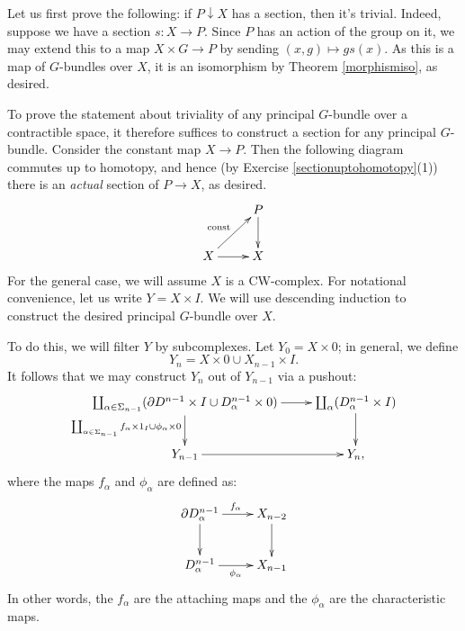 Let us first prove the following: if $P\downarrow X$ has a section, then it's
trivial. Indeed, suppose we have a section $s:X\to P$. Since $P$ has an action
of the group on it, we may extend this to a map $X\times G\to P$ by sending
$(x,g)\mapsto gs(x)$. As this is a map of $G$-bundles over $X$, it is an
isomorphism by Theorem \ref{morphismiso}, as desired.

To prove the statement about triviality of any principal $G$-bundle over a
contractible space, it therefore suffices to construct a section for any
principal $G$-bundle. Consider the constant map $X\to P$. Then the following
diagram commutes up to homotopy, and hence (by Exercise
\ref{sectionuptohomotopy}(1)) there is an \emph{actual} section of $P\to X$, as
desired.
\begin{equation*}
    \xymatrix{
	& P\ar[d]\\
	X\ar[ur]^{\mathrm{const}}\ar[r] & X
    }
\end{equation*}
For the general case, we will assume $X$ is a CW-complex. For notational
convenience, let us write $Y=X\times I$. We will use descending induction to
construct the desired principal $G$-bundle over $X$.

To do this, we will filter $Y$ by subcomplexes. Let $Y_0 = X\times 0$; in
general, we define
$$Y_n = X\times 0\cup X_{n-1}\times I.$$
It follows that we may construct $Y_n$ out of $Y_{n-1}$ via a pushout:
\begin{equation*}
    \xymatrix{
	\coprod_{\alpha\in\Sigma_{n-1}}(\partial D^{n-1}\times I \cup
	D^{n-1}_\alpha\times 0) \ar[r]\ar[d]_{\coprod_{\alpha\in\Sigma_{n-1}}
	f_\alpha\times 1_I\cup\phi_\alpha\times 0} &
	\coprod_\alpha(D^{n-1}_\alpha\times I) \ar[d]\\
	Y_{n-1}\ar[r] & Y_n,
    }
\end{equation*}
where the maps $f_\alpha$ and $\phi_\alpha$ are defined as:
\begin{equation*}
    \xymatrix{
	\partial D^{n-1}_\alpha\ar[r]^{f_\alpha}\ar[d] & X_{n-2}\ar[d]\\
	D^{n-1}_\alpha\ar[r]_{\phi_\alpha} & X_{n-1}
    }
\end{equation*}
In other words, the $f_\alpha$ are the attaching maps and the $\phi_\alpha$ are
the characteristic maps.

